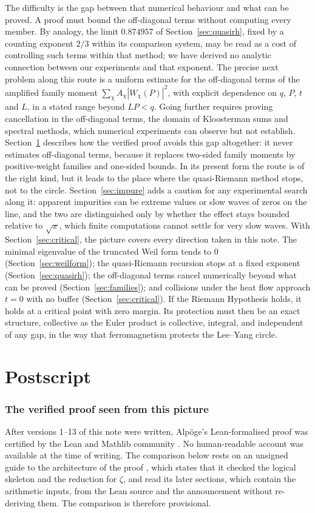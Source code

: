 \documentclass[11pt,a4paper]{article}
\theoremstyle{definition}\newtheorem{definition}[proposition]{Definition}
\theoremstyle{remark}\newtheorem{remark}[proposition]{Remark}
\begin{document}
The difficulty is the gap between that numerical behaviour and what can be proved. A proof must bound the off-diagonal terms without computing every member. By analogy, the limit $0.874957$ of Section~\ref{sec:quasirh}, fixed by a counting exponent $2/3$ within its comparison system, may be read as a cost of controlling such terms within that method; we have derived no analytic connection between our experiments and that exponent. The precise next problem along this route is a uniform estimate for the off-diagonal terms of the amplified family moment $\sum_\chi A_\chi|W_\chi(P)|^2$, with explicit dependence on $q$, $P$, $t$ and $L$, in a stated range beyond $LP<q$. Going further requires proving cancellation in the off-diagonal terms, the domain of Kloosterman sums and spectral methods, which numerical experiments can observe but not establish. Section~\ref{sec:verified} describes how the verified proof avoids this gap altogether: it never estimates off-diagonal terms, because it replaces two-sided family moments by positive-weight families and one-sided bounds. In its present form the route is of the right kind, but it leads to the place where the quasi-Riemann method stops, not to the circle. Section~\ref{sec:impure} adds a caution for any experimental search along it: apparent impurities can be extreme values or slow waves of zeros on the line, and the two are distinguished only by whether the effect stays bounded relative to $\sqrt x$, which finite computations cannot settle for very slow waves. With Section~\ref{sec:critical}, the picture covers every direction taken in this note. The minimal eigenvalue of the truncated Weil form tends to $0$ (Section~\ref{sec:weilform}); the quasi-Riemann recursion stops at a fixed exponent (Section~\ref{sec:quasirh}); the off-diagonal terms cancel numerically beyond what can be proved (Section~\ref{sec:families}); and collisions under the heat flow approach $t=0$ with no buffer (Section~\ref{sec:critical}). If the Riemann Hypothesis holds, it holds at a critical point with zero margin. Its protection must then be an exact structure, collective as the Euler product is collective, integral, and independent of any gap, in the way that ferromagnetism protects the Lee--Yang circle.

\part{Postscript}

\section{The verified proof seen from this picture}\label{sec:verified}
After versions 1--13 of this note were written, Alp\"oge's Lean-formalised proof \cite{Alpoge2026} was certified by the Lean and Mathlib community \cite{LeanStatement2026}. No human-readable account was available at the time of writing. The comparison below rests on an unsigned guide to the architecture of the proof \cite{Guide2026}, which states that it checked the logical skeleton and the reduction for $\zeta$, and read its later sections, which contain the arithmetic inputs, from the Lean source and the announcement without re-deriving them. The comparison is therefore provisional.
\end{document}
